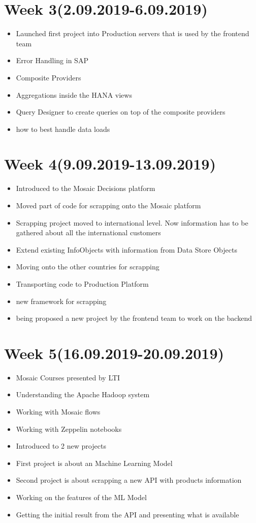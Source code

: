 \documentclass{article}
\begin{document}
	\section{Week 3(2.09.2019-6.09.2019)}
	\begin{itemize}
		\item Launched first project into Production servers that is used by the frontend team
		\item Error Handling in SAP
		\item Composite Providers
		\item Aggregations inside the HANA views
		\item Query Designer to create queries on top of the composite providers
		\item how to best handle data loads
	\end{itemize}

	\section{Week 4(9.09.2019-13.09.2019)}
	\begin{itemize}
		\item Introduced to the Mosaic Decisions platform
		\item Moved part of code for scrapping onto the Mosaic platform
		\item Scrapping project moved to international level. Now information has to be gathered about all the international customers
		\item Extend existing InfoObjects with information from Data Store Objects
		\item Moving onto the other countries for scrapping
		\item Transporting code to Production Platform
		\item new framework for scrapping
		\item being proposed a new project by the frontend team to work on the backend
	\end{itemize}

	\section{Week 5(16.09.2019-20.09.2019)}
	\begin{itemize}
		\item Mosaic Courses presented by LTI
		\item Understanding the Apache Hadoop system
		\item Working with Mosaic flows
		\item Working with Zeppelin notebooks
		\item Introduced to 2 new projects
		\item First project is about an Machine Learning Model
		\item Second project is about scrapping a new API with products information
		\item Working on the features of the ML Model
		\item Getting the initial result from the API and presenting what is available
	\end{itemize}
\end{document}
